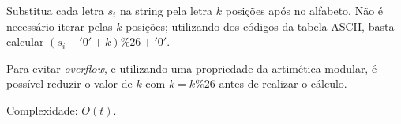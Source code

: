 Substitua cada letra $s_i$ na string pela letra $k$ posições após no alfabeto. Não é
necessário iterar pelas $k$ posições; utilizando dos códigos da tabela ASCII,
basta calcular $(s_i - '0' + k)\%26 + '0'$.

Para evitar \textit{overflow}, e utilizando uma propriedade da artimética
modular, é possível reduzir o valor de $k$ com $k=k\%26$ antes de realizar o
cálculo.

Complexidade: $O(t)$.
